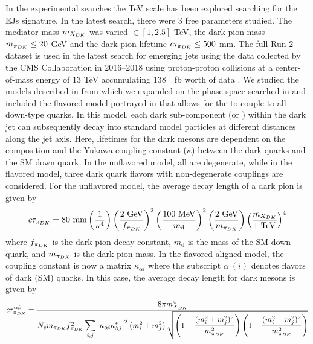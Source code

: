 In the experimental searches \cite{sirunyan2019search,CMS:2024gxp} the TeV scale has been explored searching for the EJs signature.
In the latest search, there were 3 free parameters studied. The mediator mass $m_{X_{DK}}$ was varied $\in [1,2.5]$ TeV, the dark pion mass $m_{\pi_{DK}}\leq 20$ GeV and the dark pion lifetime $c\tau_{\pi_{DK}} \leq 500$ mm.
The full Run 2 dataset is used in the latest search for emerging jets using the data collected by the CMS Collaboration in 2016--2018 using proton-proton collisions at a center-of-mass energy of 13 TeV accumulating 138~\unit{\per\femto\barn} worth of data \cite{CMS:2024gxp}.
We studied the models described in \cite{Bai_2014,Schwaller:2015gea,Renner_2018} from which we expanded on the phase space searched in \cite{sirunyan2019search} and included the flavored model portrayed in  that allows for the \Qdark to couple to all down-type quarks. In this model, each dark sub-component (or \pidark) within the dark jet can subsequently decay into standard model particles at different distances along the jet axis.
Here, lifetimes for the dark mesons are dependent on the \Qdark composition and the Yukawa coupling constant ($\kappa$) between the dark quarks and the SM down quark.
In the unflavored model, all \Qdark are degenerate, while in the flavored model, three dark quark flavors with non-degenerate couplings are considered.
For the unflavored model, the average decay length of a dark pion is given by 
\begin{equation}
	\ctaudpi = 80~\unit{mm} \pgroup{\frac{1}{\kappa^4}} \pgroup{\frac{2 ~\unit{GeV} }{f_{\pidark}}}^2 \pgroup{\frac{100 ~\unit{MeV}}{m_\text{d}} }^2 \pgroup{\frac{2~\unit{GeV}}{m_{\pidark}}} \pgroup{\frac{m_{\Mdark}}{1~\unit{TeV}}}^4
	\label{eq:unflavored-ctau}
\end{equation}
where $f_{\pi_{DK}}$ is the dark pion decay constant, $m_\text{d}$ is the mass of the SM down quark, and $m_{\pi_{DK}}$ is the dark pion mass. In the flavored aligned model, the coupling constant is now a matrix $\kappa_{\alpha i}$ where the subscript $\alpha ~(i)$ denotes flavors of dark (SM) quarks. In this case, the average decay length for dark mesons is given by 
\begin{equation}
	c\tau_{\pi_{DK}}^{\alpha \beta} = \dfrac{8\pi m^4_{X_{DK}}}{ N_c m_{\pi_{DK}} f^2_{\pi_{DK}} \displaystyle \sum_{i,j} \abs{\kappa_{\alpha i} \kappa_{\beta j}^*}^2 \left(m_i^2 + m_j^2\right) \sqrt{ \left(1- \dfrac{(m_i^2 + m_j^2)^2 }{m^2_{\pi_{DK}}} \right) \left(1- \dfrac{(m_i^2 - m_j^2)^2 }{m^2_{\pi_{DK}}} \right) } }
	\label{eq:flavored-ctau}
\end{equation}
